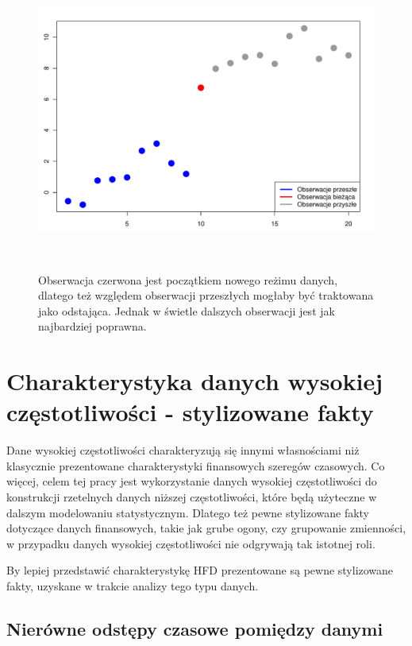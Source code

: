 \documentclass[a4paper,12pt,openany, DIV=calc, headsepline]{scrbook}
\begin{document}
\begin{figure}[H]
  \centering
  \includegraphics[width=170mm, height=100mm]{wykresy/odst2}
  \caption{Obserwacja czerwona jest początkiem nowego reżimu danych, dlatego też względem obserwacji przeszłych mogłaby być traktowana jako odstająca. Jednak w świetle dalszych obserwacji jest jak najbardziej poprawna.}
  \label{fig:odst2}
\end{figure}

\section{Charakterystyka danych wysokiej częstotliwości - stylizowane fakty}

Dane wysokiej częstotliwości charakteryzują się innymi własnościami niż klasycznie prezentowane charakterystyki finansowych szeregów czasowych. Co więcej, celem tej pracy jest wykorzystanie danych wysokiej częstotliwości do konstrukcji rzetelnych danych niższej częstotliwości, które będą użyteczne w dalszym modelowaniu statystycznym. Dlatego też pewne stylizowane fakty dotyczące danych finansowych, takie jak grube ogony, czy grupowanie zmienności, w przypadku danych wysokiej częstotliwości nie odgrywają tak istotnej roli.

By lepiej przedstawić charakterystykę HFD prezentowane są pewne stylizowane fakty, uzyskane w trakcie analizy tego typu danych.

\subsection{Nierówne odstępy czasowe pomiędzy danymi}
\end{document}
